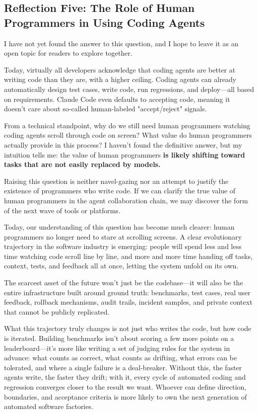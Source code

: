 \subsection{Reflection Five: The Role of Human Programmers in Using Coding Agents}

\begin{myquote}
I have not yet found the answer to this question, and I hope to leave it as an open topic for readers to explore together.

Today, virtually all developers acknowledge that coding agents are better at writing code than they are, with a higher ceiling. Coding agents can already automatically design test cases, write code, run regressions, and deploy---all based on requirements. Claude Code even defaults to accepting code, meaning it doesn't care about so-called human-labeled "accept/reject" signals.

From a technical standpoint, why do we still need human programmers watching coding agents scroll through code on screen? What value do human programmers actually provide in this process? I haven't found the definitive answer, but my intuition tells me: the value of human programmers \textbf{is likely shifting toward tasks that are not easily replaced by models.}

Raising this question is neither navel-gazing nor an attempt to justify the existence of programmers who write code. If we can clarify the true value of human programmers in the agent collaboration chain, we may discover the form of the next wave of tools or platforms.
\end{myquote}

Today, our understanding of this question has become much clearer: human programmers no longer need to stare at scrolling screens.
A clear evolutionary trajectory in the software industry is emerging: people will spend less and less time watching code scroll line by line, and more and more time handing off tasks, context, tests, and feedback all at once, letting the system unfold on its own.

The scarcest asset of the future won't just be the codebase---it will also be the entire infrastructure built around ground truth: benchmarks, test cases, real user feedback, rollback mechanisms, audit trails, incident samples, and private context that cannot be publicly replicated.

\vspace{1em}

What this trajectory truly changes is not just who writes the code, but how code is iterated. Building benchmarks isn't about scoring a few more points on a leaderboard---it's more like writing a set of judging rules for the system in advance: what counts as correct, what counts as drifting, what errors can be tolerated, and where a single failure is a deal-breaker. Without this, the faster agents write, the faster they drift; with it, every cycle of automated coding and regression converges closer to the result we want. Whoever can define direction, boundaries, and acceptance criteria is more likely to own the next generation of automated software factories.


